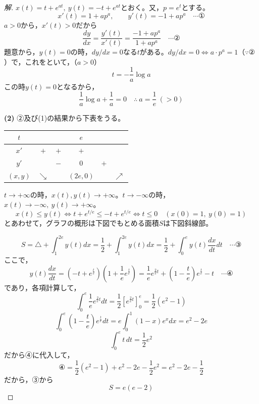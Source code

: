 \documentclass[../main.tex]{subfiles}
\begin{document}
\begin{proof}[解]
  $x(t)=t+e^{at},\ y(t)=-t+e^{at}$とおく。又，$p=e^t$とする。
  \[
    x'(t)=1+ap^a, \qquad y'(t)=-1+ap^a \quad\cdots\text{①}
  \]
  $a>0$から，$x'(t)>0$だから
  \[
    \frac{dy}{dx}=\frac{y'(t)}{x'(t)}=\frac{-1+ap^a}{1+ap^a} \quad\cdots\text{②}
  \]
  題意から，$y(t)=0$の時，$dy/dx=0$なる$t$がある。$dy/dx=0\iff a\cdot p^a=1$（$\because②$）で，これをといて，（$a>0$）
  \[
    t=-\frac1a\log a
  \]
  この時$y(t)=0$となるから，
  \[
    \frac1a\log a+\frac1a=0 \quad\therefore\ a=\frac1e\ (>0)
  \]

  \textbf{(2)} ②及び(1)の結果から下表をうる。
  \begin{center}
    \begin{tabular}{c|ccccc}
      $t$ & & & $e$ & & \\
      \hline
      $x'$ & $+$ & $+$ & $+$ & & \\
      \hline
      $y'$ & & $-$ & $0$ & $+$ & \\
      \hline
      $(x,y)$ & $\searrow$ & & $(2e,0)$ & & $\nearrow$
    \end{tabular}
  \end{center}
  $t\to+\infty$の時，$x(t),y(t)\to+\infty$。$t\to-\infty$の時，$x(t)\to-\infty,\ y(t)\to+\infty$。
  \[
    x(t)\le y(t)\iff t+e^{t/e}\le-t+e^{t/e}\iff t\le0 \quad(x(0)=1,\ y(0)=1)
  \]
  とあわせて，グラフの概形は下図でもとめる面積$S$は下図斜線部。

  \begin{center}
  \end{center}

  \[
    S=\triangle+\int_1^{2e}y(t)dx=\frac12+\int_1^{2e}y(t)dx=\frac12+\int_0^ey(t)\frac{dx}{dt}dt \quad\cdots\text{③}
  \]
  ここで，
  \[
    y(t)\frac{dx}{dt}=\left(-t+e^{\frac{t}{e}}\right)\left(1+\frac1ee^{\frac{t}{e}}\right)=\frac1ee^{\frac2et}+\left(1-\frac{t}{e}\right)e^{\frac{t}{e}}-t \quad\cdots\text{④}
  \]
  であり，各項計算して，
  \[
    \int_0^e\frac1ee^{\frac2et}dt=\frac12\left[e^{\frac2et}\right]_0^e=\frac12(e^2-1)
  \]
  \[
    \int_0^e\left(1-\frac{t}{e}\right)e^{\frac{t}{e}}dt=e\int_0^1(1-x)e^xdx=e^2-2e
  \]
  \[
    \int_0^et\,dt=\frac12e^2
  \]
  だから④に代入して，
  \[
    ④=\frac12(e^2-1)+e^2-2e-\frac12e^2=e^2-2e-\frac12
  \]
  だから，③から
  \[
    S=e(e-2)
  \]
\end{proof}
\end{document}
